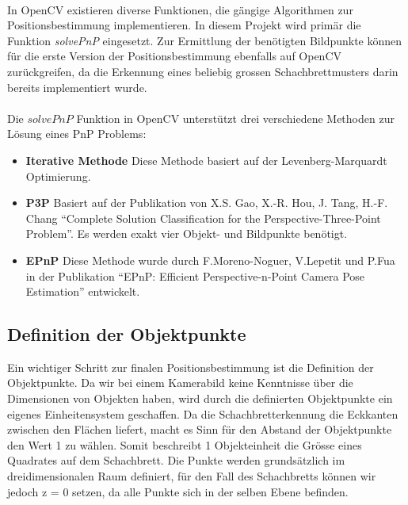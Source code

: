 \paragraph{}
In OpenCV existieren diverse Funktionen, die gängige Algorithmen zur Positionsbestimmung implementieren. In diesem Projekt wird primär die Funktion \textit{solvePnP} eingesetzt.  Zur Ermittlung der benötigten Bildpunkte können für die erste Version der Positionsbestimmung ebenfalls auf OpenCV zurückgreifen, da die Erkennung eines beliebig grossen Schachbrettmusters  darin bereits implementiert wurde. 

\paragraph{}
Die $solvePnP$ Funktion in OpenCV unterstützt drei verschiedene Methoden zur Lösung eines PnP Problems:

\begin{itemize}

\item \textbf{Iterative Methode}
Diese Methode basiert auf der Levenberg-Marquardt Optimierung.

\item \textbf{P3P}
Basiert auf der Publikation von X.S. Gao, X.-R. Hou, J. Tang, H.-F. Chang ``Complete Solution Classification for the Perspective-Three-Point Problem''. Es werden exakt vier Objekt- und Bildpunkte benötigt.

\item \textbf{EPnP}
Diese Methode wurde durch F.Moreno-Noguer, V.Lepetit und P.Fua in der Publikation ``EPnP: Efficient Perspective-n-Point Camera Pose Estimation'' entwickelt.

\end{itemize}


\subsection{Definition der Objektpunkte}
\label{sec:definition-objektpunkte}

Ein wichtiger Schritt zur finalen Positionsbestimmung ist die Definition der Objektpunkte. Da wir bei einem Kamerabild keine Kenntnisse über die Dimensionen von Objekten haben, wird durch die definierten Objektpunkte ein eigenes Einheitensystem geschaffen. Da die Schachbretterkennung die Eckkanten zwischen den Flächen liefert, macht es Sinn für den Abstand der Objektpunkte den Wert 1 zu wählen. Somit beschreibt 1 Objekteinheit die Grösse eines Quadrates auf dem Schachbrett. Die Punkte werden grundsätzlich im dreidimensionalen Raum definiert, für den Fall des Schachbretts können wir jedoch z = 0 setzen, da alle Punkte sich in der selben Ebene befinden.

